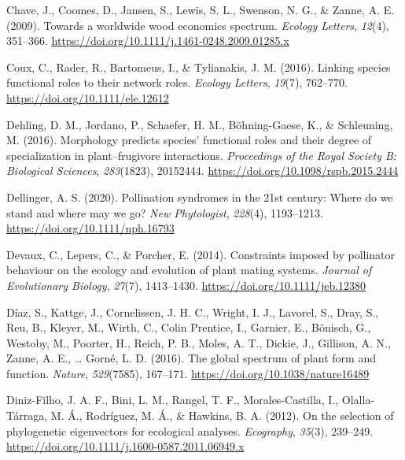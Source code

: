 \documentclass[
  12pt,
  a4paper,
]{article}
\newlength{\cslhangindent}
\newlength{\cslentryspacingunit} %
\newenvironment{CSLReferences}[2] %
 {%
  \setlength{\parindent}{0pt}
  \ifodd #1
  \let\oldpar\par
  \def\par{\hangindent=\cslhangindent\oldpar}
  \fi
  \setlength{\parskip}{#2\cslentryspacingunit}
 }%
 {}
\begin{document}
\begin{CSLReferences}{1}{0}
\leavevmode{}%
Chave, J., Coomes, D., Jansen, S., Lewis, S. L., Swenson, N. G., \& Zanne, A. E. (2009). Towards a worldwide wood economics spectrum. \emph{Ecology Letters}, \emph{12}(4), 351--366. \url{https://doi.org/10.1111/j.1461-0248.2009.01285.x}

\leavevmode{}%
Coux, C., Rader, R., Bartomeus, I., \& Tylianakis, J. M. (2016). Linking species functional roles to their network roles. \emph{Ecology Letters}, \emph{19}(7), 762--770. \url{https://doi.org/10.1111/ele.12612}

\leavevmode{}%
Dehling, D. M., Jordano, P., Schaefer, H. M., Böhning-Gaese, K., \& Schleuning, M. (2016). Morphology predicts species' functional roles and their degree of specialization in plant--frugivore interactions. \emph{Proceedings of the Royal Society B: Biological Sciences}, \emph{283}(1823), 20152444. \url{https://doi.org/10.1098/rspb.2015.2444}

\leavevmode{}%
Dellinger, A. S. (2020). Pollination syndromes in the 21st century: Where do we stand and where may we go? \emph{New Phytologist}, \emph{228}(4), 1193--1213. \url{https://doi.org/10.1111/nph.16793}

\leavevmode{}%
Devaux, C., Lepers, C., \& Porcher, E. (2014). Constraints imposed by pollinator behaviour on the ecology and evolution of plant mating systems. \emph{Journal of Evolutionary Biology}, \emph{27}(7), 1413--1430. \url{https://doi.org/10.1111/jeb.12380}

\leavevmode{}%
Díaz, S., Kattge, J., Cornelissen, J. H. C., Wright, I. J., Lavorel, S., Dray, S., Reu, B., Kleyer, M., Wirth, C., Colin Prentice, I., Garnier, E., Bönisch, G., Westoby, M., Poorter, H., Reich, P. B., Moles, A. T., Dickie, J., Gillison, A. N., Zanne, A. E., \ldots{} Gorné, L. D. (2016). The global spectrum of plant form and function. \emph{Nature}, \emph{529}(7585), 167--171. \url{https://doi.org/10.1038/nature16489}

\leavevmode{}%
Diniz-Filho, J. A. F., Bini, L. M., Rangel, T. F., Morales-Castilla, I., Olalla-Tárraga, M. Á., Rodríguez, M. Á., \& Hawkins, B. A. (2012). On the selection of phylogenetic eigenvectors for ecological analyses. \emph{Ecography}, \emph{35}(3), 239--249. \url{https://doi.org/10.1111/j.1600-0587.2011.06949.x}


\end{CSLReferences}
\end{document}
